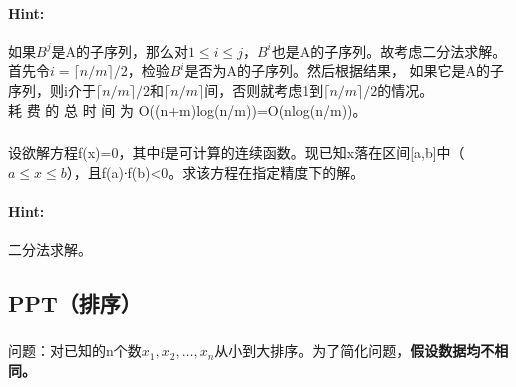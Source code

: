 \documentclass{article}
\begin{document}
     \paragraph{Hint:}如果$B^j$是A的子序列，那么对$1 \leq i \leq j$，$B^{i}$也是A的子序列。故考虑二分法求解。
     首先令$i=\lceil n/m \rceil /2$，检验$B^i$是否为A的子序列。然后根据结果，
如果它是A的子序列，则i介于$ \lceil n/m \rceil /2$和$ \lceil n/m \rceil $间，否则就考虑1到$ \lceil  n/m \rceil /2$的情况。\\
      耗 费 的 总 时 间 为 O((n+m)log(n/m))=O(nlog(n/m))。
     \subsubsection{}设欲解方程f(x)=0，其中f是可计算的连续函数。现已知x落在区间[a,b]中（$a \leq x \leq b$），且f(a)∙f(b)<0。求该方程在指定精度下的解。

     \paragraph{Hint:}二分法求解。
     
     
     \subsection{PPT（排序）}
     \subsubsection{}问题：对已知的n个数$x_1
,x_2,…,x_{n}$从小到大排序。为了简化问题，\textbf{假设数据均不相同。}
\end{document}

